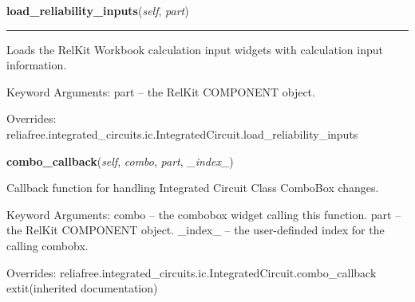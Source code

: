     \vspace{0.5ex}

\hspace{.8\funcindent}\begin{boxedminipage}{\funcwidth}

    \raggedright \textbf{load\_reliability\_inputs}(\textit{self}, \textit{part})

    \vspace{-1.5ex}

    \rule{\textwidth}{0.5\fboxrule}
\setlength{\parskip}{2ex}
    Loads the RelKit Workbook calculation input widgets with calculation
    input information.

    Keyword Arguments: part -- the RelKit COMPONENT object.

\setlength{\parskip}{1ex}
      Overrides: reliafree.integrated\_circuits.ic.IntegratedCircuit.load\_reliability\_inputs

    \end{boxedminipage}

    \vspace{0.5ex}

\hspace{.8\funcindent}\begin{boxedminipage}{\funcwidth}

    \raggedright \textbf{combo\_callback}(\textit{self}, \textit{combo}, \textit{part}, \textit{\_index\_})

\setlength{\parskip}{2ex}
    Callback function for handling Integrated Circuit Class ComboBox 
    changes.

    Keyword Arguments: combo   -- the combobox widget calling this 
    function. part    -- the RelKit COMPONENT object. \_index\_ -- the 
    user-definded index for the calling combobx.

\setlength{\parskip}{1ex}
      Overrides: reliafree.integrated\_circuits.ic.IntegratedCircuit.combo\_callback 	extit{(inherited documentation)}

    \end{boxedminipage}

    \label{reliafree:integrated_circuits:logic:Logic:calculate_mil_217_count}

    \vspace{0.5ex}

